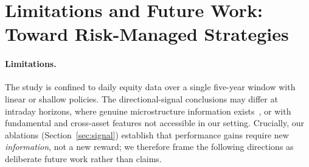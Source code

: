 \documentclass[11pt]{article}
\theoremstyle{definition}
\begin{document}
\section{Limitations and Future Work: Toward Risk-Managed Strategies}\label{sec:future}

\paragraph{Limitations.} The study is confined to daily equity data over a single
five-year window with linear or shallow policies. The directional-signal conclusions
may differ at intraday horizons, where genuine microstructure information
exists~\cite{nevmyvaka2006,spooner2018}, or with fundamental and cross-asset features
not accessible in our setting. Crucially, our ablations (Section~\ref{sec:signal})
establish that performance gains require new \emph{information}, not a new reward; we
therefore frame the following directions as deliberate future work rather than claims.
\end{document}
